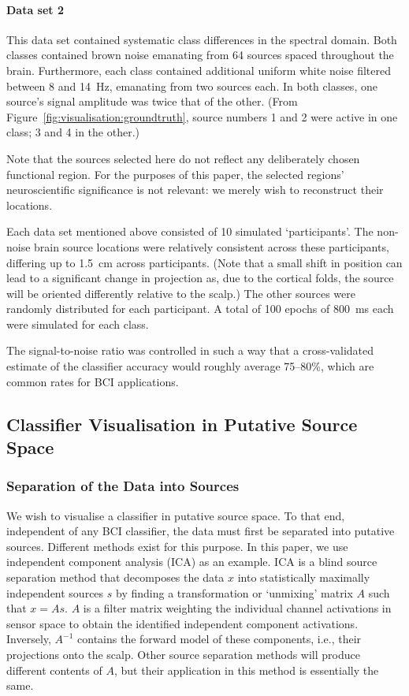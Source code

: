 \paragraph{Data set 2} This data set contained systematic class differences in the spectral domain. Both classes contained brown noise emanating from 64 sources spaced throughout the brain. Furthermore, each class contained additional uniform white noise filtered between 8 and 14~Hz, emanating from two sources each. In both classes, one source's signal amplitude was twice that of the other. (From Figure~\ref{fig:visualisation:groundtruth}, source numbers 1 and 2 were active in one class; 3 and 4 in the other.)

Note that the sources selected here do not reflect any deliberately chosen functional region. For the purposes of this paper, the selected regions' neuroscientific significance is not relevant: we merely wish to reconstruct their locations.

Each data set mentioned above consisted of 10 simulated `participants'. The non-noise brain source locations were relatively consistent across these participants, differing up to 1.5~cm across participants. (Note that a small shift in position can lead to a significant change in projection as, due to the cortical folds, the source will be oriented differently relative to the scalp.) The other sources were randomly distributed for each participant. A total of 100 epochs of 800~ms each were simulated for each class.

The signal-to-noise ratio was controlled in such a way that a cross-validated estimate of the classifier accuracy would roughly average 75--80\%, which are common rates for BCI applications.


\subsection{Classifier Visualisation in Putative Source Space}


\subsubsection{Separation of the Data into Sources}

We wish to visualise a classifier in putative source space. To that end, independent of any BCI classifier, the data must first be separated into putative sources. Different methods exist for this purpose. In this paper, we use independent component analysis (ICA) \cite{bell1995} as an example. ICA is a blind source separation method that decomposes the data $x$ into statistically maximally independent sources $s$ by finding a transformation or `unmixing' matrix $A$ such that $x=As$. $A$ is a filter matrix weighting the individual channel activations in sensor space to obtain the identified independent component activations. Inversely, $A^{-1}$ contains the forward model of these components, i.e., their projections onto the scalp. Other source separation methods will produce different contents of $A$, but their application in this method is essentially the same.


